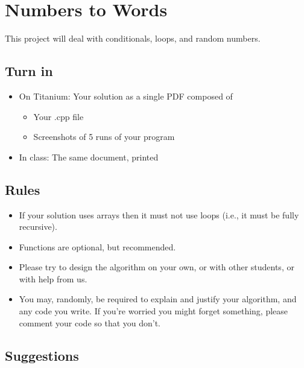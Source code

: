 \documentclass[12pt,letterpaper]{article}
\begin{document}
\thispagestyle{firstpage}


\section*{Numbers to Words}

This project will deal with conditionals, loops, and random numbers.


\filbreak
\subsection*{Turn in}

\begin{itemize}
  \item On Titanium: Your solution as a single PDF composed of
    \begin{itemize}
      \item Your .cpp file
      \item Screenshots of 5 runs of your program
    \end{itemize}
  \item In class: The same document, printed
\end{itemize}


\filbreak
\subsection*{Rules}

\begin{itemize}
  \item If your solution uses arrays then it must not use loops (i.e., it must
    be fully recursive).
  \item Functions are optional, but recommended.
  \item Please try to design the algorithm on your own, or with other students,
    or with help from us.
  \item You may, randomly, be required to explain and justify your algorithm,
    and any code you write.  If you're worried you might forget something,
    please comment your code so that you don't.
\end{itemize}


\filbreak
\subsection*{Suggestions}
\end{document}
